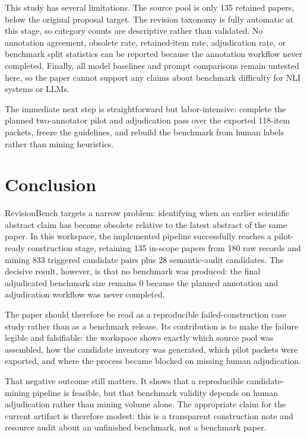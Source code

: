 \documentclass{article}
\begin{document}
This study has several limitations. The source pool is only 135 retained papers, below the original proposal target. The revision taxonomy is fully automatic at this stage, so category counts are descriptive rather than validated. No annotation agreement, obsolete rate, retained-item rate, adjudication rate, or benchmark split statistics can be reported because the annotation workflow never completed. Finally, all model baselines and prompt comparisons remain untested here, so the paper cannot support any claims about benchmark difficulty for NLI systems or LLMs.

The immediate next step is straightforward but labor-intensive: complete the planned two-annotator pilot and adjudication pass over the exported 118-item packets, freeze the guidelines, and rebuild the benchmark from human labels rather than mining heuristics.

\section{Conclusion}
\label{sec:conclusion}

RevisionBench targets a narrow problem: identifying when an earlier scientific abstract claim has become obsolete relative to the latest abstract of the same paper. In this workspace, the implemented pipeline successfully reaches a pilot-ready construction stage, retaining 135 in-scope papers from 180 raw records and mining 833 triggered candidate pairs plus 28 semantic-audit candidates. The decisive result, however, is that no benchmark was produced: the final adjudicated benchmark size remains 0 because the planned annotation and adjudication workflow was never completed.

The paper should therefore be read as a reproducible failed-construction case study rather than as a benchmark release. Its contribution is to make the failure legible and falsifiable: the workspace shows exactly which source pool was assembled, how the candidate inventory was generated, which pilot packets were exported, and where the process became blocked on missing human adjudication.

That negative outcome still matters. It shows that a reproducible candidate-mining pipeline is feasible, but that benchmark validity depends on human adjudication rather than mining volume alone. The appropriate claim for the current artifact is therefore modest: this is a transparent construction note and resource audit about an unfinished benchmark, not a benchmark paper.
\end{document}
